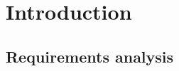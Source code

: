 \chapter{Introduction}

\lipsum[1]
\cite{Castleman98}

\section{Requirements analysis}

\lipsum[1]




